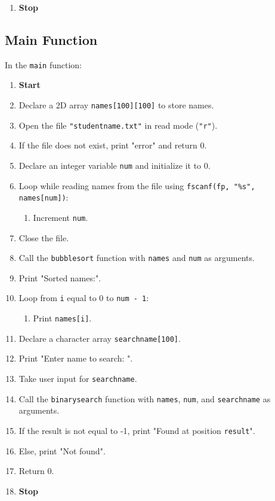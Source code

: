 {\begin{enumerate}[label=\arabic*:,left=0pt]
    \item \textbf{Stop}
  \end{enumerate}

  \subsection{Main Function}
  In the \texttt{main} function:
  \begin{enumerate}[label=\arabic*:, start=1]
    \item \textbf{Start}
    \item Declare a 2D array \texttt{names[100][100]} to store names.
    \item Open the file \texttt{"studentname.txt"} in read mode (\texttt{"r"}).
    \item If the file does not exist, print "error" and return 0.
    \item Declare an integer variable \texttt{num} and initialize it to 0.
    \item Loop while reading names from the file using \texttt{fscanf(fp, "\%s", names[num])}:
          \begin{enumerate}[label=5.\arabic*:, start=1]
            \item Increment \texttt{num}.
          \end{enumerate}
    \item Close the file.
    \item Call the \texttt{bubblesort} function with \texttt{names} and \texttt{num} as arguments.
    \item Print "Sorted names:".
    \item Loop from \texttt{i} equal to 0 to \texttt{num - 1}:
          \begin{enumerate}[label=9.\arabic*:, start=1]
            \item Print \texttt{names[i]}.
          \end{enumerate}
    \item Declare a character array \texttt{searchname[100]}.
    \item Print "Enter name to search: ".
    \item Take user input for \texttt{searchname}.
    \item Call the \texttt{binarysearch} function with \texttt{names}, \texttt{num}, and \texttt{searchname} as arguments.
    \item If the result is not equal to -1, print "Found at position \texttt{result}".
    \item Else, print "Not found".
    \item Return 0.
    \item \textbf{Stop}
  \end{enumerate}
 }

